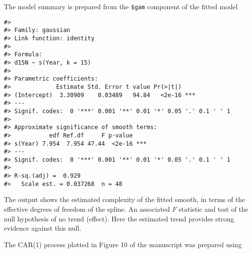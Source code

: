 \documentclass[12pt,]{article}
\newenvironment{Shaded}{\begin{snugshade}}{\end{snugshade}}
\newcommand{\KeywordTok}[1]{\textcolor[rgb]{0.13,0.29,0.53}{\textbf{{#1}}}}
\newcommand{\NormalTok}[1]{{#1}}
\begin{document}
The model summary is prepared from the \texttt{\$gam} component of the
fitted model

\begin{Shaded}
\end{Shaded}

\begin{verbatim}
#> 
#> Family: gaussian 
#> Link function: identity 
#> 
#> Formula:
#> d15N ~ s(Year, k = 15)
#> 
#> Parametric coefficients:
#>             Estimate Std. Error t value Pr(>|t|)    
#> (Intercept)  3.30909    0.03489   94.84   <2e-16 ***
#> ---
#> Signif. codes:  0 '***' 0.001 '**' 0.01 '*' 0.05 '.' 0.1 ' ' 1
#> 
#> Approximate significance of smooth terms:
#>           edf Ref.df     F p-value    
#> s(Year) 7.954  7.954 47.44  <2e-16 ***
#> ---
#> Signif. codes:  0 '***' 0.001 '**' 0.01 '*' 0.05 '.' 0.1 ' ' 1
#> 
#> R-sq.(adj) =  0.929   
#>   Scale est. = 0.037268  n = 48
\end{verbatim}

The output shows the estimated complexity of the fitted smooth, in terms
of the effective degrees of freedom of the spline. An associated \(F\)
statistic and test of the null hypothesis of no trend (effect). Here the
estimated trend provides strong evidence against this null.

The CAR(1) process plotted in Figure 10 of the manuscript was prepared
using
\end{document}
